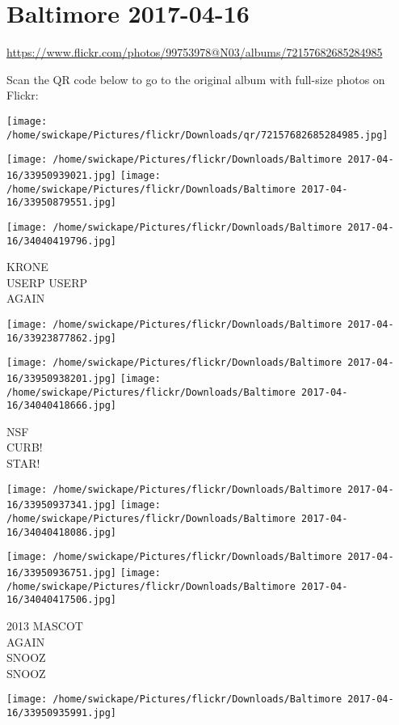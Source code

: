 \documentclass[10pt,letterpaper]{article}
\title{}
\author{}
\date{}
\begin{document}
\section*{Baltimore 2017-04-16}

\url{https://www.flickr.com/photos/99753978@N03/albums/72157682685284985}

Scan the QR code below to go to the original album with full-size photos on Flickr:

\texttt{[image: /home/swickape/Pictures/flickr/Downloads/qr/72157682685284985.jpg]}
\pagebreak

\texttt{[image: /home/swickape/Pictures/flickr/Downloads/Baltimore 2017-04-16/33950939021.jpg]}
\texttt{[image: /home/swickape/Pictures/flickr/Downloads/Baltimore 2017-04-16/33950879551.jpg]}

\texttt{[image: /home/swickape/Pictures/flickr/Downloads/Baltimore 2017-04-16/34040419796.jpg]}

KRONE\\
USERP USERP\\
AGAIN
\pagebreak

\texttt{[image: /home/swickape/Pictures/flickr/Downloads/Baltimore 2017-04-16/33923877862.jpg]}

\vspace{0.25in}
\texttt{[image: /home/swickape/Pictures/flickr/Downloads/Baltimore 2017-04-16/33950938201.jpg]}
\texttt{[image: /home/swickape/Pictures/flickr/Downloads/Baltimore 2017-04-16/34040418666.jpg]}

NSF\\
CURB!\\
STAR!
\pagebreak

\texttt{[image: /home/swickape/Pictures/flickr/Downloads/Baltimore 2017-04-16/33950937341.jpg]}
\texttt{[image: /home/swickape/Pictures/flickr/Downloads/Baltimore 2017-04-16/34040418086.jpg]}

\texttt{[image: /home/swickape/Pictures/flickr/Downloads/Baltimore 2017-04-16/33950936751.jpg]}
\texttt{[image: /home/swickape/Pictures/flickr/Downloads/Baltimore 2017-04-16/34040417506.jpg]}

2013 MASCOT\\
AGAIN\\
SNOOZ\\
SNOOZ
\pagebreak

\texttt{[image: /home/swickape/Pictures/flickr/Downloads/Baltimore 2017-04-16/33950935991.jpg]}
\end{document}
